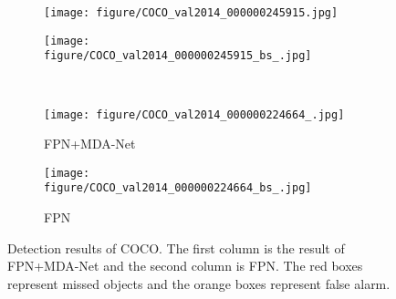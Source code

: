 \documentclass[10pt,twocolumn,letterpaper]{article}
\begin{document}
	\begin{figure}[!tb]
		\centering
		\begin{subfigure}{.23\textwidth}
			\centering
			\texttt{[image: figure/COCO\_val2014\_000000245915.jpg]}
			\caption{}
			\label{fig:COCO_val2014_000000245915}
		\end{subfigure}
		\begin{subfigure}{.23\textwidth}
			\centering
			\texttt{[image: figure/COCO\_val2014\_000000245915\_bs\_.jpg]}
			\caption{}
			\label{fig:COCO_val2014_000000245915_bs}
		\end{subfigure} \\
		\vspace{-10pt}
		\begin{subfigure}{.23\textwidth}
			\centering
			\texttt{[image: figure/COCO\_val2014\_000000224664\_.jpg]}
			\caption*{FPN+MDA-Net}
			\label{fig:COCO_val2014_000000224664}
		\end{subfigure}
		\begin{subfigure}{.23\textwidth}
			\centering
			\texttt{[image: figure/COCO\_val2014\_000000224664\_bs\_.jpg]}
			\caption*{FPN}
			\label{fig:COCO_val2014_000000224664_bs}
		\end{subfigure}
		\vspace{-10pt}
		\caption{Detection results of COCO. The first column is the result of FPN+MDA-Net and the second column is FPN. The red boxes represent missed objects and the orange boxes represent false alarm.}
		\label{fig:coco_det}
	\end{figure}
	
\end{document}
